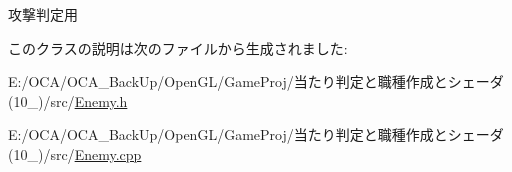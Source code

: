 攻撃判定用 



このクラスの説明は次のファイルから生成されました\-:\begin{DoxyCompactItemize}
\item 
E\-:/\-O\-C\-A/\-O\-C\-A\-\_\-\-Back\-Up/\-Open\-G\-L/\-Game\-Proj/当たり判定と職種作成とシェーダ(10\-\_)/src/\hyperlink{_enemy_8h}{Enemy.\-h}\item 
E\-:/\-O\-C\-A/\-O\-C\-A\-\_\-\-Back\-Up/\-Open\-G\-L/\-Game\-Proj/当たり判定と職種作成とシェーダ(10\-\_)/src/\hyperlink{_enemy_8cpp}{Enemy.\-cpp}\end{DoxyCompactItemize}
